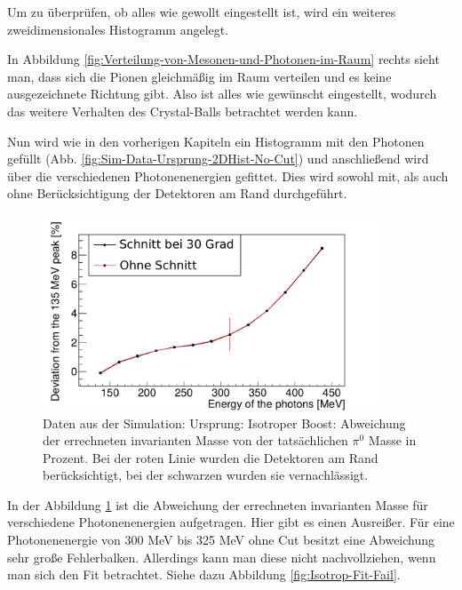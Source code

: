 \documentclass[a4paper,11pt,oneside,final,german,openbib,pdftex]{scrbook}
\begin{document}
{%

Um zu überprüfen, ob alles wie gewollt eingestellt ist, wird ein weiteres zweidimensionales Histogramm angelegt.



In Abbildung \ref{fig:Verteilung-von-Mesonen-und-Photonen-im-Raum} rechts sieht man, dass sich die Pionen gleichm\"a{\ss}ig im Raum verteilen und es keine ausgezeichnete Richtung gibt. Also ist alles wie gew\"unscht eingestellt, wodurch das weitere Verhalten des Crystal-Balls betrachtet werden kann.

Nun wird wie in den vorherigen Kapiteln ein Histogramm mit den Photonen gefüllt (Abb. \ref{fig:Sim-Data-Ursprung-2DHist-No-Cut}) und anschließend wird über die verschiedenen Photonenenergien gefittet. Dies wird sowohl mit, als auch ohne Berücksichtigung der Detektoren am Rand durchgeführt.

\begin{figure}[h!]
	\begin{center}
		\includegraphics[width=100mm]{20172804IsotropUrpsprungDeviation}
	\end{center}
\caption[Simulation: Isotroper Zerfall Abweichung mit und ohne Detektoren am Rand]{Daten aus der Simulation: Ursprung: Isotroper Boost: Abweichung der errechneten invarianten Masse von der tatsächlichen $\pi^0$ Masse in Prozent. Bei der roten Linie wurden die Detektoren am Rand berücksichtigt, bei der schwarzen wurden sie vernachlässigt.}
\label{fig:Pi0-Ursprung-Relative-Abweichung}
\end{figure}



In der Abbildung \ref{fig:Pi0-Ursprung-Relative-Abweichung} ist die Abweichung der errechneten invarianten Masse für verschiedene Photonenenergien aufgetragen.
Hier gibt es einen Ausrei{\ss}er. F\"ur eine Photonenenergie von 300 MeV bis 325 MeV ohne Cut besitzt eine Abweichung sehr gro{\ss}e Fehlerbalken. Allerdings kann man diese nicht nachvollziehen, wenn man sich den Fit betrachtet. Siehe dazu Abbildung \ref{fig:Isotrop-Fit-Fail}.

}
\end{document}
